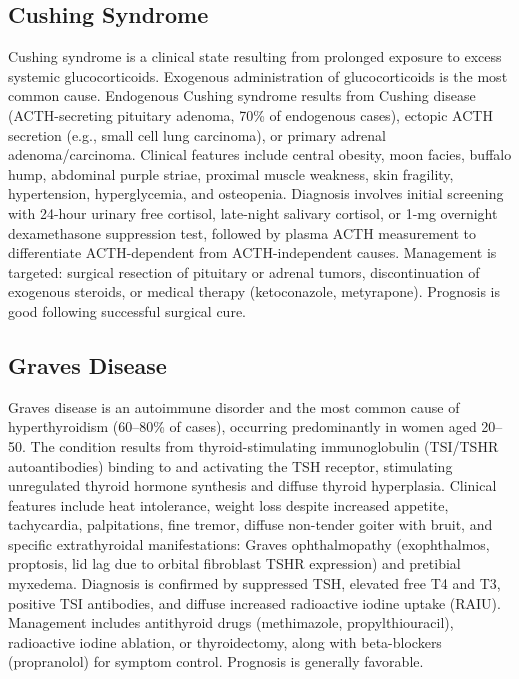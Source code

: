 \subsection{Cushing Syndrome}
\label{sec:Cushing Syndrome}
Cushing syndrome is a clinical state resulting from prolonged exposure to excess systemic glucocorticoids. Exogenous administration of glucocorticoids is the most common cause. Endogenous Cushing syndrome results from Cushing disease (ACTH-secreting pituitary adenoma, 70\% of endogenous cases), ectopic ACTH secretion (e.g., small cell lung carcinoma), or primary adrenal adenoma/carcinoma. Clinical features include central obesity, moon facies, buffalo hump, abdominal purple striae, proximal muscle weakness, skin fragility, hypertension, hyperglycemia, and osteopenia. Diagnosis involves initial screening with 24-hour urinary free cortisol, late-night salivary cortisol, or 1-mg overnight dexamethasone suppression test, followed by plasma ACTH measurement to differentiate ACTH-dependent from ACTH-independent causes. Management is targeted: surgical resection of pituitary or adrenal tumors, discontinuation of exogenous steroids, or medical therapy (ketoconazole, metyrapone). Prognosis is good following successful surgical cure.

\subsection{Graves Disease}
\label{sec:Graves Disease}
Graves disease is an autoimmune disorder and the most common cause of hyperthyroidism (60--80\% of cases), occurring predominantly in women aged 20--50. The condition results from thyroid-stimulating immunoglobulin (TSI/TSHR autoantibodies) binding to and activating the TSH receptor, stimulating unregulated thyroid hormone synthesis and diffuse thyroid hyperplasia. Clinical features include heat intolerance, weight loss despite increased appetite, tachycardia, palpitations, fine tremor, diffuse non-tender goiter with bruit, and specific extrathyroidal manifestations: Graves ophthalmopathy (exophthalmos, proptosis, lid lag due to orbital fibroblast TSHR expression) and pretibial myxedema. Diagnosis is confirmed by suppressed TSH, elevated free T4 and T3, positive TSI antibodies, and diffuse increased radioactive iodine uptake (RAIU). Management includes antithyroid drugs (methimazole, propylthiouracil), radioactive iodine ablation, or thyroidectomy, along with beta-blockers (propranolol) for symptom control. Prognosis is generally favorable.

